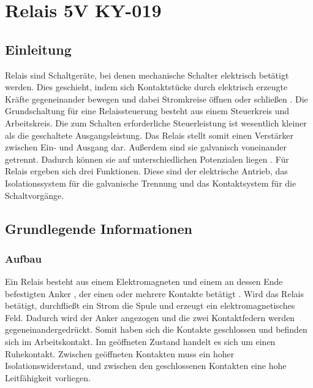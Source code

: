 %
%
%

\chapter{Relais 5V KY-019}\label{Relais}
\label{chap:relais}

\section{Einleitung}
Relais sind Schaltgeräte, bei denen mechanische Schalter elektrisch betätigt werden. Dies geschieht, indem sich Kontaktstücke durch elektrisch erzeugte Kräfte gegeneinander bewegen und dabei Stromkreise öffnen oder schließen \cite{Schlaak:2006}. Die Grundschaltung für eine Relaissteuerung besteht aus einem Steuerkreis und Arbeitskreis. Die zum Schalten erforderliche Steuerleistung ist wesentlich kleiner als die geschaltete Ausgangsleistung. Das Relais stellt somit einen Verstärker zwischen Ein- und Ausgang dar. Außerdem sind sie galvanisch voneinander getrennt. Dadurch können sie auf unterschiedlichen Potenzialen liegen \cite{Bohmer:2018}. 
Für Relais ergeben sich drei Funktionen. Diese sind der elektrische Antrieb, das Isolationssystem für die galvanische Trennung und das Kontaktsystem für die Schaltvorgänge.\cite{Schlaak:2006}

\section{Grundlegende Informationen}
\subsection*{Aufbau}
Ein Relais besteht aus einem Elektromagneten und einem an dessen Ende befestigten Anker \cite{Elektro4000:2025}, der einen oder mehrere Kontakte betätigt \cite{Bohmer:2018}. Wird das Relais betätigt, durchfließt ein Strom die Spule und erzeugt ein elektromagnetisches Feld. Dadurch wird der Anker angezogen und die zwei Kontaktfedern werden gegeneinandergedrückt. Somit haben sich die Kontakte geschlossen und befinden sich im Arbeitskontakt. Im geöffneten Zustand handelt es sich um einen Ruhekontakt. Zwischen geöffneten Kontakten muss ein hoher Isolationswiderstand, und zwischen den geschlossenen Kontakten eine hohe Leitfähigkeit vorliegen. \cite{Schlaak:2006}

